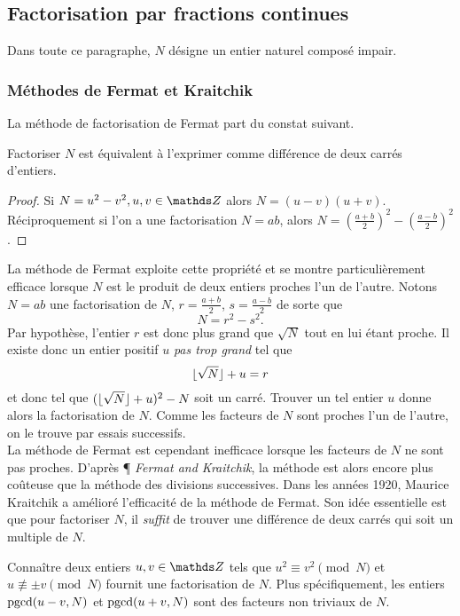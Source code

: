 \subsection{Factorisation par fractions continues}

Dans toute ce paragraphe, $N$ désigne un entier naturel composé impair.

\subsubsection{Méthodes de Fermat et Kraitchik}

La méthode de factorisation de Fermat part du constat suivant.

\begin{lemme}
	Factoriser $N$ est équivalent à l'exprimer comme différence de deux carrés
	d'entiers.
\end{lemme}

\begin{proof}
	Si $N = u^2 - v^2, u, v\in \Z$ alors $N = (u-v)(u + v)$. Réciproquement si
	l'on a une factorisation $N = ab$, alors $N = \left(\frac{a+b}{2}\right)^2
	- \left(\frac{a-b}{2}\right)^2$.
\end{proof}

La méthode de Fermat exploite cette propriété et se montre particulièrement
efficace lorsque $N$ est le produit de deux entiers proches l'un de l'autre.
Notons $N=ab$ une factorisation de $N$, $r=\frac{a+b}{2}$, $s=\frac{a-b}{2}$ de
sorte que \[N = r^2 - s^2.\] Par hypothèse, l'entier $r$ est donc plus grand
que $\sqrt{N}$ tout en lui étant proche. Il existe donc un entier positif $u$
\emph{pas trop grand} tel que \[\lfloor\sqrt{N}\rfloor + u = r\] et donc tel que
$(\lfloor\sqrt{N}\rfloor + u)^2 - N$ soit un carré. Trouver un tel entier $u$ donne
alors la factorisation de $N$. Comme les facteurs de $N$ sont proches l'un de
l'autre, on le trouve par essais successifs. \\

La méthode de Fermat est cependant inefficace lorsque les facteurs de $N$ ne
sont pas proches. D'après \cite{Tale} ¶ \emph{Fermat and Kraitchik}, la méthode
est alors encore plus coûteuse que la méthode des divisions successives. Dans
les années 1920, Maurice Kraitchik a amélioré l'efficacité de la méthode de
Fermat. Son idée essentielle est que pour factoriser $N$, il \emph{suffit} de
trouver une différence de deux carrés qui soit un multiple de $N$.

\begin{lemme}
	Connaître deux entiers $u, v \in \Z$ tels que $u^2 \equiv v^2 
	\pmod{N}$ et $u\not\equiv \pm v\pmod{N}$ fournit une factorisation de $N$.
	Plus spécifiquement, les entiers $\operatorname{pgcd}(u-v, N)$ et $\operatorname{pgcd}(u+v, N)$ sont
	des facteurs non triviaux de $N$.
\end{lemme}

